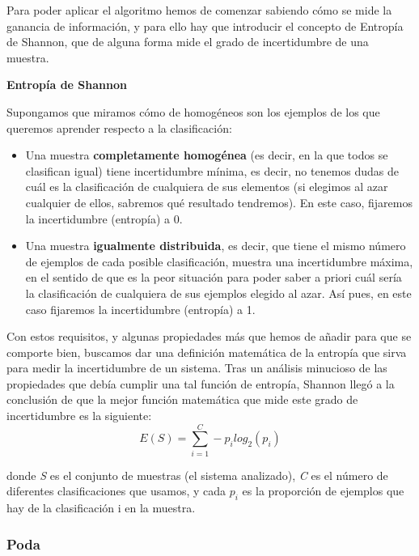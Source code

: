 \documentclass[10pt]{article}
\begin{document}
Para poder aplicar el algoritmo hemos de comenzar sabiendo cómo se mide la ganancia de información, y para ello hay que introducir el concepto de Entropía de Shannon, que de alguna forma mide el grado de incertidumbre de una muestra\cite{IEEEreferencias:Ref45}.

\textbf{Entropía de Shannon}

Supongamos que miramos cómo de homogéneos son los ejemplos de los que queremos aprender respecto a la clasificación:
\begin{itemize}
    \item Una muestra \textbf{completamente homogénea} (es decir, en la que todos se clasifican igual) tiene incertidumbre mínima, es decir, no tenemos dudas de cuál es la clasificación de cualquiera de sus elementos (si elegimos al azar cualquier de ellos, sabremos qué resultado tendremos). En este caso, fijaremos la incertidumbre (entropía) a 0\cite{IEEEreferencias:Ref45}.
    \item Una muestra \textbf{igualmente distribuida}, es decir, que tiene el mismo número de ejemplos de cada posible clasificación, muestra una incertidumbre máxima, en el sentido de que es la peor situación para poder saber a priori cuál sería la clasificación de cualquiera de sus ejemplos elegido al azar. Así pues, en este caso fijaremos la incertidumbre (entropía) a 1\cite{IEEEreferencias:Ref45}.
\end{itemize}
Con estos requisitos, y algunas propiedades más que hemos de añadir para que se comporte bien, buscamos dar una definición matemática de la entropía que sirva para medir la incertidumbre de un sistema. Tras un análisis minucioso de las propiedades que debía cumplir una tal función de entropía, Shannon llegó a la conclusión de que la mejor función matemática que mide este grado de incertidumbre es la siguiente:
 \begin{equation}\label{eq:ej}
E(S) = \sum_{i=1}^{C}-p_{i}log_{2}(p_{i})
\end{equation}

donde \textit{S} es el conjunto de muestras (el sistema analizado), \textit{C} es el número de diferentes clasificaciones que usamos, y cada $p_{i}$ es la proporción de ejemplos que hay de la clasificación i en la muestra.

\subsubsection{Poda}
\end{document}
